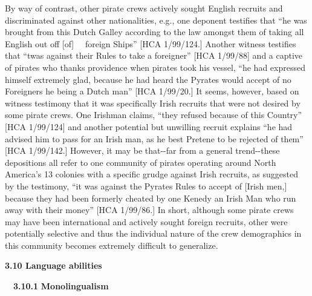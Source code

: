 \begin{styleStandard}
By way of contrast, other pirate crews actively sought English recruits and discriminated against other nationalities, e.g., one deponent testifies that “he was brought from this Dutch Galley according to the law amongst them of taking all English out off [of] \ \ foreign Ships” [HCA 1/99/124.] Another witness testifies that “twas against their Rules to take a foreigner” [HCA 1/99/88] and a captive of pirates who thanks providence when pirates took his vessel, “he had expressed himself extremely glad, because he had heard the Pyrates would accept of no Foreigners he being a Dutch man” [HCA 1/99/20.] It seems, however, based on witness testimony that it was specifically Irish recruits that were not desired by some pirate crews. One Irishman claims, “they refused because of this Country” [HCA 1/99/124] and another potential but unwilling recruit explains “he had advised him to pass for an Irish man, as he best Pretene to be rejected of them” [HCA 1/99/142.] However, it may be that-{}-far from a general trend-{}-these depositions all refer to one community of pirates operating around North America’s 13 colonies with a specific grudge against Irish recruits, as suggested by the testimony, “it was against the Pyrates Rules to accept of [Irish men,] because they had been formerly cheated by one Kenedy an Irish Man who run away with their money” [HCA 1/99/86.] In short, although some pirate crews may have been international and actively sought foreign recruits, other were potentially selective and thus the individual nature of the crew demographics in this community becomes extremely difficult to generalize. \ 
\end{styleStandard}


\begin{styleStandard}
\textbf{3.10 Language abilities }
\end{styleStandard}


\begin{styleStandard}
\ \ \textbf{3.10.1} \textbf{Monolingualism}
\end{styleStandard}


